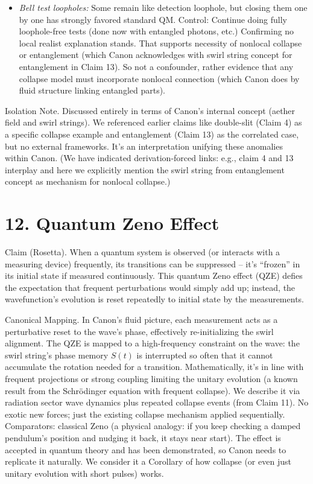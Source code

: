 \documentclass[11pt]{article}
\begin{document}
\begin{itemize}
\item 
\textit{Bell test loopholes:} Some remain like detection loophole, but closing them one by one has strongly favored standard QM. Control: Continue doing fully loophole-free tests (done now with entangled photons, etc.) Confirming no local realist explanation stands. That supports necessity of nonlocal collapse or entanglement (which Canon acknowledges with swirl string concept for entanglement in Claim 13). So not a confounder, rather evidence that any collapse model must incorporate nonlocal connection (which Canon does by fluid structure linking entangled parts).




\end{itemize}

Isolation Note. Discussed entirely in terms of Canon’s internal concept (aether field and swirl strings). We referenced earlier claims like double-slit (Claim 4) as a specific collapse example and entanglement (Claim 13) as the correlated case, but no external frameworks. It's an interpretation unifying these anomalies within Canon. (We have indicated derivation-forced links: e.g., claim 4 and 13 interplay and here we explicitly mention the swirl string from entanglement concept as mechanism for nonlocal collapse.)


\section*{12. Quantum Zeno Effect}

Claim (Rosetta). When a quantum system is observed (or interacts with a measuring device) frequently, its transitions can be suppressed – it’s “frozen” in its initial state if measured continuously. This quantum Zeno effect (QZE) defies the expectation that frequent perturbations would simply add up; instead, the wavefunction’s evolution is reset repeatedly to initial state by the measurements.


Canonical Mapping. In Canon’s fluid picture, each measurement acts as a perturbative reset to the wave’s phase, effectively re-initializing the swirl alignment. The QZE is mapped to a high-frequency constraint on the wave: the swirl string’s phase memory $S(t)$ is interrupted so often that it cannot accumulate the rotation needed for a transition. Mathematically, it’s in line with frequent projections or strong coupling limiting the unitary evolution (a known result from the Schrödinger equation with frequent collapse). We describe it via radiation sector wave dynamics plus repeated collapse events (from Claim 11). No exotic new forces; just the existing collapse mechanism applied sequentially. Comparators: classical Zeno (a physical analogy: if you keep checking a damped pendulum’s position and nudging it back, it stays near start). The effect is accepted in quantum theory and has been demonstrated, so Canon needs to replicate it naturally. We consider it a Corollary of how collapse (or even just unitary evolution with short pulses) works.
\end{document}
